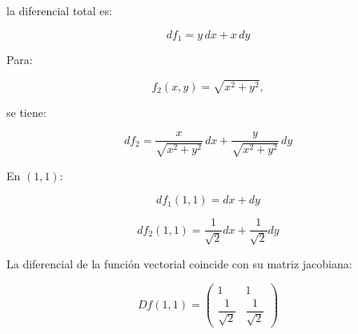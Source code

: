 \documentclass[11pt,a4paper]{article}
\begin{document}
la diferencial total es:

\[
\boxed{
df_1
=
y\,dx+x\,dy
}
\]

Para:

\[
f_2(x,y)
=
\sqrt{x^2+y^2},
\]

se tiene:

\[
\boxed{
df_2
=
\frac{x}{\sqrt{x^2+y^2}}\,dx
+
\frac{y}{\sqrt{x^2+y^2}}\,dy
}
\]

En \((1,1)\):

\[
\boxed{
df_1(1,1)
=
dx+dy
}
\]

\[
\boxed{
df_2(1,1)
=
\frac1{\sqrt2}dx
+
\frac1{\sqrt2}dy
}
\]

La diferencial de la función vectorial coincide con su matriz jacobiana:

\[
\boxed{
Df(1,1)
=
\begin{pmatrix}
1&1\\
\dfrac1{\sqrt2}&\dfrac1{\sqrt2}
\end{pmatrix}
}
\]
\end{document}
